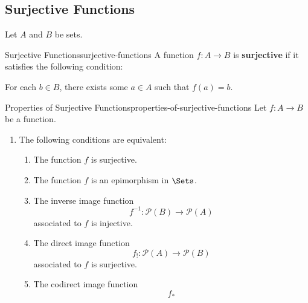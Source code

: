 \subsection{Surjective Functions}\label{subsection-surjective-functions}
Let $A$ and $B$ be sets.
\begin{definition}{Surjective Functions}{surjective-functions}%
    A function $f\colon A\to B$ is \textbf{surjective} if it satisfies the following condition:
    \begin{itemize}
        \itemstar For each $b\in B$, there exists some $a\in A$ such that $f(a)=b$.
    \end{itemize}
\end{definition}
\begin{proposition}{Properties of Surjective Functions}{properties-of-surjective-functions}%
    Let $f\colon A\to B$ be a function.
    \begin{enumerate}
        \item\label{properties-of-surjective-functions-characterisations}The following conditions are equivalent:
            \begin{enumerate}
                \item\label{properties-of-surjective-functions-characterisations-1}The function $f$ is surjective.
                \item\label{properties-of-surjective-functions-characterisations-2}The function $f$ is an epimorphism in $\Sets$.
                \item\label{properties-of-surjective-functions-characterisations-3}The inverse image function
                    \[
                        f^{-1}%
                        \colon%
                        \mathcal{P}(B)%
                        \to%
                        \mathcal{P}(A)%
                    \]%
                    associated to $f$ is injective.
                \item\label{properties-of-surjective-functions-characterisations-4}The direct image function
                    \[
                        f_{!}%
                        \colon%
                        \mathcal{P}(A)%
                        \to%
                        \mathcal{P}(B)%
                    \]%
                    associated to $f$ is surjective.
                \item\label{properties-of-surjective-functions-characterisations-5}The codirect image function
                    \[
                        f_{*}%
\]
\end{enumerate}
\end{enumerate}
\end{proposition}
